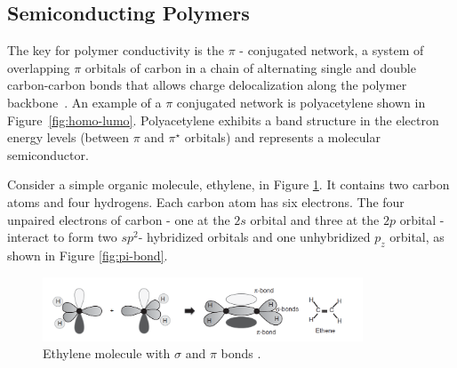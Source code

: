 \subsection{Semiconducting Polymers}
\par
The key for polymer conductivity is the $\pi$ - conjugated network, a system of overlapping $\pi$ orbitals of carbon in a chain of alternating single and double carbon-carbon bonds that allows charge delocalization along the polymer backbone~\cite{heeger_polymers,Koehler_book,Casado_2021_book}. An example of a $\pi$ conjugated network is polyacetylene shown in Figure~\ref{fig:homo-lumo}. Polyacetylene exhibits a band structure in the electron energy levels (between $\pi$ and $\pi^\star$ orbitals) and represents a molecular semiconductor.\\
\par
Consider a simple organic molecule, ethylene, in Figure \ref{fig:ethylene}. It contains two carbon atoms and four hydrogens. Each carbon atom has six electrons. The four unpaired electrons of carbon - one at the $2s$ orbital and three at the $2p$ orbital - interact to form two $sp^2$- hybridized orbitals and one unhybridized $p_z$ orbital, as shown in Figure \ref{fig:pi-bond}. 

\begin{figure} [h]
\centering
\includegraphics[width = 0.85\textwidth]{./electrochemistry/figures/ethylene.png}
\caption{Ethylene molecule with $\sigma$ and $\pi$ bonds \cite{Koehler_book}.}
\label{fig:ethylene}
\end{figure}

